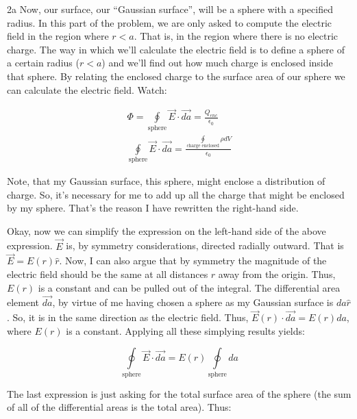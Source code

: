 \begin{homeworkProblem}[Quiz 3, Pr. 2]
\begin{homeworkSection}{2a}
        Now, our surface, our ``Gaussian surface'', will be a sphere
        with a specified radius. In this part of the problem, we are
        only asked to compute the electric field in the region where
        $r<a$. That is, in the region where there is no electric charge.
        The way in which we'll calculate the electric field is to define
        a sphere of a certain radius ($r<a$) and we'll find out how much
        charge is enclosed inside that sphere. By relating the enclosed
        charge to the surface area of our sphere we can calculate the
        electric field. Watch:

        \begin{align}
            \label{}
            \Phi = \oint\limits_{\text{sphere}} \vec{E}\cdot\vec{da} =
            \frac{Q_{enc}}{\epsilon_0} \nonumber \\
            \oint\limits_{\text{sphere}} \vec{E}\cdot\vec{da} =
            \frac{\oint\limits_{\text{charge enclosed}}\rho dV}{\epsilon_0}
        \end{align}

        Note, that my Gaussian surface, this sphere, might enclose a
        distribution of charge. So, it's necessary for me to add up all
        the charge that might be enclosed by my sphere. That's the
        reason I have rewritten the right-hand side.

        Okay, now we can simplify the expression on the left-hand side
        of the above expression. $\vec{E}$ is, by symmetry
        considerations, directed radially outward. That is $\vec{E} =
        E(r) \hat{r}$. Now, I can also argue that by symmetry the
        magnitude of the electric field should be the same at all
        distances $r$ away from the origin. Thus, $E(r)$ is a constant
        and can be pulled out of the integral. The differential area
        element $\vec{da}$, by virtue of me having chosen a sphere as my
        Gaussian surface is $da \hat{r}$. So, it is in the same
        direction as the electric field. Thus, $\vec{E}(r) \cdot
        \vec{da} = E(r) da$, where $E(r)$ is a constant. Applying all
        these simplying results yields:

        \[
        \oint\limits_{\text{sphere}} \vec{E}\cdot\vec{da} = E(r)
        \oint\limits_{\text{sphere}} da
        \]

        The last expression is just asking for the total surface area of
        the sphere (the sum of all of the differential areas is the
        total area). Thus:
        

\end{homeworkSection}
\end{homeworkProblem}
